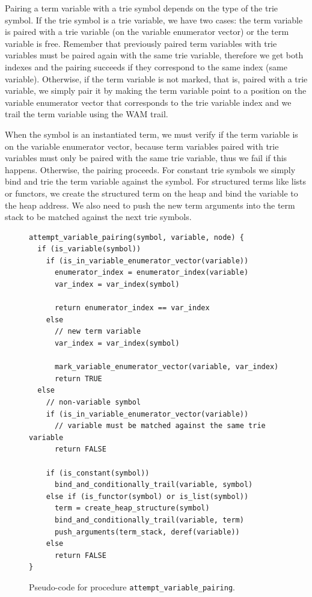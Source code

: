 Pairing a term variable with a trie symbol depends on the type of the trie symbol.
If the trie symbol is a trie variable, we have two cases: the term variable is paired
with a trie variable (on the variable enumerator vector) or the term variable is free.
Remember that previously paired term variables with trie variables must be paired
again with the same trie variable, therefore we get both indexes and the pairing
succeeds if they correspond to the same index (same variable). Otherwise, if the
term variable is not marked, that is, paired with a trie variable, we simply pair it
by making the term variable point to a position on the variable enumerator vector that
corresponds to the trie variable index and we trail the term variable using the WAM trail.

When the symbol is an instantiated term, we must verify if the term variable is on
the variable enumerator vector, because term variables paired with trie variables
must only be paired with the same trie variable, thus we fail if this happens.
Otherwise, the pairing proceeds.
For constant trie symbols we simply bind and trie the term variable against the symbol.
For structured terms like lists or functors, we create the structured term on the heap
and bind the variable to the heap address. We also need to push the new term arguments
into the term stack to be matched against the next trie symbols.

\begin{figure}[ht]
\begin{Verbatim}
attempt_variable_pairing(symbol, variable, node) {
  if (is_variable(symbol))
    if (is_in_variable_enumerator_vector(variable))
      enumerator_index = enumerator_index(variable)
      var_index = var_index(symbol)
      
      return enumerator_index == var_index
    else
      // new term variable
      var_index = var_index(symbol)
      
      mark_variable_enumerator_vector(variable, var_index)
      return TRUE
  else
    // non-variable symbol
    if (is_in_variable_enumerator_vector(variable))
      // variable must be matched against the same trie variable
      return FALSE
    
    if (is_constant(symbol))
      bind_and_conditionally_trail(variable, symbol)
    else if (is_functor(symbol) or is_list(symbol))
      term = create_heap_structure(symbol)
      bind_and_conditionally_trail(variable, term)
      push_arguments(term_stack, deref(variable))
    else
      return FALSE
}
\end{Verbatim}
\caption{Pseudo-code for procedure \texttt{attempt\_variable\_pairing}.}
\label{fig:attempt_variable_pairing}
\end{figure}


